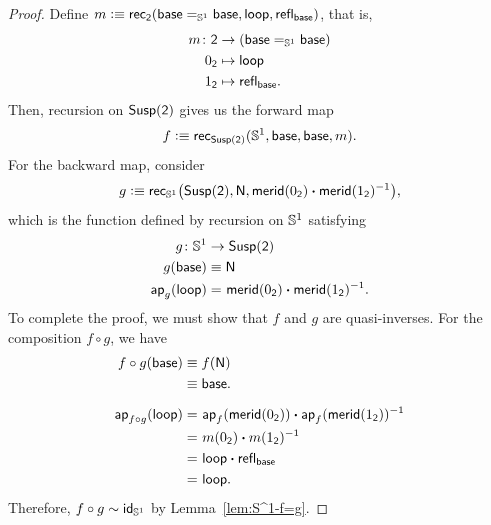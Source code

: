 \begin{proof}
    Define $m\mathrel{\vcentcolon}\equiv\mathsf{rec}_{\mathsf{2}}(\mathsf{base}\mathrel{=_{\mathbb S^1}}\mathsf{base},\mathsf{loop},\mathsf{refl}_{\mathsf{base}})$, that is,
    \begin{align*}
        m\colon\fun2
            &\to(\fun{base}\eq{\sphere^1}\fun{base})\\
        0_{\fun2}&\mapsto\fun{loop}\\
        1_{\fun2}&\mapsto\fun{refl}_{\fun{base}}.
    \end{align*}
    Then, recursion on $\mathsf{Susp}(\mathsf{2})$ gives us the forward map
    \[
        f\mathrel{\vcentcolon}\equiv\mathsf{rec}_{\mathsf{Susp}(\mathsf{2})}
            (\mathbb S^1,\mathsf{base},\mathsf{base},m).
    \]
    For the backward map, consider 
    \[
        g\mathrel{\vcentcolon}\equiv\mathsf{rec}_{\mathbb S^1}
            \bigl(
                \mathsf{Susp}(\mathsf{2}),
                \mathsf{N},
                \mathsf{merid}(0_{\mathsf{2}})
                    \mathbin{\boldsymbol{\cdot}}\mathsf{merid}(1_{\mathsf{2}})^{-1}
            \bigr),
    \]
    which is the function defined by recursion on $\mathbb S^1$ satisfying
    \begin{align*}
        g\colon\sphere^1&\to\fun{Susp}(\fun2)\\
        g(\fun{base})&\equiv\fun N\\
        \fun{ap}_g(\fun{loop})
            &\eq{}\fun{merid}(0_{\fun2})
            \ct\fun{merid}(1_{\fun2})^{-1}.
    \end{align*}
    To complete the proof, we must show that $f$ and $g$ are quasi-inverses. For the composition $f\circ g$, we have
    \begin{align*}
        f\circ g(\mathsf{base})
            &\equiv f(\mathsf{N})\\
            &\equiv\mathsf{base}.\\[2mm]
        \mathsf{ap}_{f\circ g}(\mathsf{loop})
            &\mathrel{=_{}}
                \mathsf{ap}_f(\mathsf{merid}(0_{\mathsf{2}}))
                \mathbin{\boldsymbol{\cdot}}
                \mathsf{ap}_f(\mathsf{merid}(1_{\mathsf{2}}))^{-1}\\
            &\mathrel{=_{}}m(0_{\mathsf{2}})\mathbin{\boldsymbol{\cdot}} m(1_{\mathsf{2}})^{-1}\\
            &\mathrel{=_{}}\mathsf{loop}\mathbin{\boldsymbol{\cdot}}\mathsf{refl}_{\mathsf{base}}\\
            &\mathrel{=_{}}\mathsf{loop}.
    \end{align*}
    Therefore, $f\circ g\sim\mathsf{id}_{\mathbb S^1}$ by Lemma~\ref{lem:S^1-f=g}.


\end{proof}
